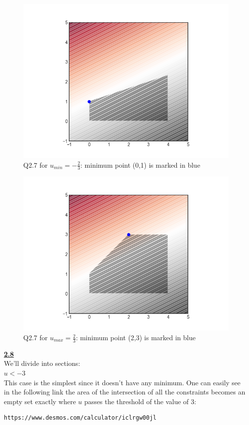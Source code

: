 \documentclass[fleqn]{article}
\begin{document}
\begin{figure}[h!]
\includegraphics[width=0.8\linewidth]{q2_7_u_min.PNG}
\caption{Q2.7 for $u_{min}=-\frac{2}{3}$: minimum point (0,1) is marked in blue}
\end{figure}

\begin{figure}[h!]
\includegraphics[width=0.8\linewidth]{q2_7_u_max.PNG}
\caption{Q2.7 for $u_{max}=\frac{2}{3}$: minimum point (2,3) is marked in blue}
\end{figure}

\underline{\textbf{2.8}} \\

We'll divide into sections: \\

\underline{$u<-3$} \\

This case is the simplest since it doesn't have any minimum. One can easily see in the following link the area of the intersection of all the constraints becomes an empty set exactly where $u$ passes the threshold of the value of 3: \\
\begin{lstlisting}[breaklines]
https://www.desmos.com/calculator/iclrgw00jl
\end{lstlisting}
\end{document}
